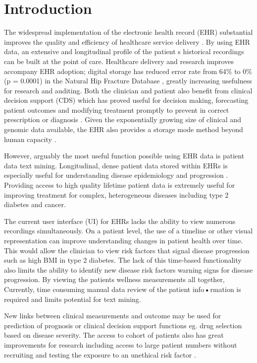 \documentclass{bioinfo}
\begin{document}
\section{Introduction}

The widespread implementation of the electronic health record (EHR) substantial improves the quality and efficiency of healthcare service delivery \cite{Evans2016}. By using EHR data, an extensive and longitudinal profile of the patient  \textquotesingles s historical recordings can be built at the point of care. Healthcare delivery and research improves accompany EHR adoption; digital storage has reduced error rate from 64\% to 0\% (p = 0.0001) in the Natural Hip Fracture Database \citep{Williams2019}, greatly increasing usefulness for research and auditing. Both the clinician and patient also benefit from clinical decision support (CDS) which has proved useful for decision making, forecasting patient outcomes and modifying treatment promptly to prevent in correct prescription or diagnosis \citep{CDS2}. Given the exponentially growing size of clinical and genomic data available, the EHR also provides a storage mode method beyond human capacity \cite{Williams2019}.

However, arguably the most useful function possible using EHR data is patient data text mining. Longitudinal, dense patient data stored within EHRs is especially useful for understanding disease epidemiology and progression \citep{Casey2016}. Providing access to high quality lifetime patient data is extremely useful for improving treatment for complex, heterogeneous diseases \citep{Faria-Campos2015} including type 2 diabetes and cancer. 


The current user interface (UI) for EHRs lacks the ability to view numerous recordings simultaneously. 
On a patient level, the use of a timeline or other visual representation can improve understanding changes in patient health over time. This would allow the clinician to view risk factors that signal disease progression such as high BMI in type 2 diabetes.
The lack of this time-based functionality also limits the ability to identify new disease risk factors  warning signs for disease progression. By viewing the patient\textquotesingle s wellness measurements all together,  Currently, time consuming manual data review of the patient info\textbf{•}rmation is required and limits potential for text mining. 

 New links between clinical measurements and outcome may be used for prediction of prognosis or clinical decision support functions eg. drug selection based on disease severity. The access to cohort of patients also has great improvements for research including access to large patient numbers without recruiting and testing the exposure to an unethical risk factor \citep{Casey2016}. 
\end{document}
